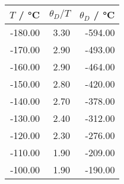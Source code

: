 \begin{tabular}{rrr}
\toprule
$T$ / °C & $\theta_D/T$ & $\theta_D$ / °C \\
\midrule
-180.00 & 3.30 & -594.00 \\
-170.00 & 2.90 & -493.00 \\
-160.00 & 2.90 & -464.00 \\
-150.00 & 2.80 & -420.00 \\
-140.00 & 2.70 & -378.00 \\
-130.00 & 2.40 & -312.00 \\
-120.00 & 2.30 & -276.00 \\
-110.00 & 1.90 & -209.00 \\
-100.00 & 1.90 & -190.00 \\
\bottomrule
\end{tabular}
